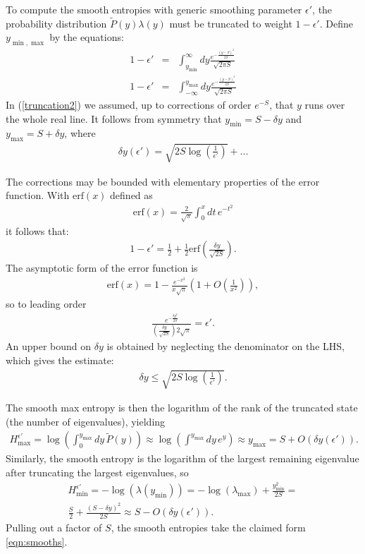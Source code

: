 \documentclass[12pt]{article}
\newcommand{\beq}{\begin{eqnarray}}
\newcommand{\eeq}{\end{eqnarray}}
\newcommand{\Hmax}{H_{\max}}
\newcommand{\Hmin}{H_{\min}}
\newcommand{\lamm}{\lambda_{\max}}
\begin{document}
To compute the smooth entropies with generic smoothing parameter $\epsilon'$, the probability distribution $\tilde{P}(y)\lambda(y)$ must be truncated to weight $1-\epsilon'$. Define $y_{\min,\max}$ by the equations:
\begin{eqnarray}
1-\epsilon' & = & \int_{y_{\min}}^\infty dy \frac{e^{-\frac{(y-S)^2}{2S}}}{\sqrt{2 \pi S}}\\
1-\epsilon' & = & \int_{-\infty}^{y_{\max}} dy \frac{e^{-\frac{(y-S)^2}{2S}}}{\sqrt{2 \pi S}}
\label{truncation2}
\end{eqnarray}
In (\ref{truncation2}) we assumed, up to corrections of order $e^{-S}$, that $y$ runs over the whole real line. It follows from symmetry that $y_{\min} = S - \delta y$ and $y_{\max} = S + \delta y$, where
\beq
\delta y(\epsilon') = \sqrt{2 S \log\left(\frac{1}{\epsilon'}\right)}+...
\eeq

The corrections may be bounded with elementary properties of the error function. With $\text{erf}(x)$ defined as
\beq
\text{erf}(x) = \frac{2}{\sqrt{\pi}}\int_0^x dt\, e^{-t^2}
\eeq
it follows that:
\beq
1-\epsilon' = \frac{1}{2} + \frac{1}{2}\text{erf}\left(\frac{\delta y}{\sqrt{2S}}\right).
\eeq
The asymptotic form of the error function is
\beq
\text{erf}(x) = 1 - \frac{e^{-x^2}}{x\sqrt{\pi}}\left(1 + O\left(\frac{1}{x^2}\right)\right),
\eeq
so to leading order
\beq
\frac{e^{-\frac{\delta y^2}{2S}}}{ \left(\frac{\delta y}{\sqrt{2S}}\right) 2\sqrt{\pi}} = \epsilon'.
\eeq
An upper bound on $\delta y$ is obtained by neglecting the denominator on the LHS, which gives the estimate:
\beq
\delta y \leq \sqrt{2 S \log\left(\frac{1}{\epsilon'}\right)}.
\eeq

The smooth max entropy is then the logarithm of the rank of the truncated state (the number of eigenvalues), yielding
\beq
\Hmax^{\epsilon'} = \log\left(\int_0^{y_{\max}} dy\, \tilde{P}(y)\right) \approx \log\left(\int^{y_{\max}} dy\, e^y \right) \approx y_{\max} = S + O(\delta y(\epsilon')).
\eeq
Similarly, the smooth entropy is the logarithm of the largest remaining eigenvalue after truncating the largest eigenvalues, so
\begin{multline}
\Hmin^{\epsilon'} = -\log(\lambda(y_{\min})) = - \log(\lamm) + \frac{y_{\min}^2}{2S} = \\
\frac{S}{2} + \frac{(S - \delta y)^2}{2 S} \approx S - O(\delta y(\epsilon')).
\end{multline}
Pulling out a factor of $S$, the smooth entropies take the claimed form \eqref{eqn:smooths}.
\end{document}
